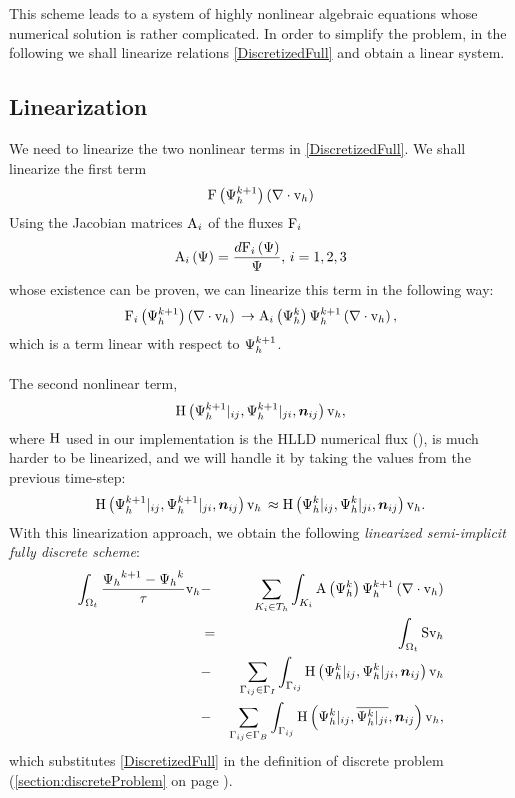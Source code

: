 This scheme leads to a system of highly nonlinear algebraic equations whose numerical solution is rather complicated. In order to simplify the problem, in the following we shall linearize relations \ref{DiscretizedFull} and obtain a linear system.
\subsection{Linearization}
We need to linearize the two nonlinear terms in \ref{DiscretizedFull}. We shall linearize the first term
$$
\mathrm{F}\left({\mathrm{\Psi}_h^{k+1}}\right) \left(\nabla \cdot \mathrm{v}_h\right)
$$
Using the Jacobian matrices $\mathrm{A}_i$ of the fluxes $\mathrm{F}_i$
$$
\mathrm{A}_i\left({\mathrm{\Psi}}\right) = \frac{d\mathrm{F}_i\left({\mathrm{\Psi}}\right)}{\mathrm{\Psi}},\,i = 1, 2, 3
$$
whose existence can be proven, we can linearize this term in the following way:
$$
\mathrm{F}_i\left({\mathrm{\Psi}_h^{k+1}}\right) \left(\nabla \cdot \mathrm{v}_h\right)\,\rightarrow \mathrm{A}_i\left({\mathrm{\Psi}_h^{k}}\right) \mathrm{\Psi}_h^{k+1} \left(\nabla \cdot \mathrm{v}_h\right),
$$
which is a term linear with respect to $\mathrm{\Psi}_h^{k+1}$.

\paragraph{}
The second nonlinear term,
$$
\mathrm{H}\left({\mathrm{\Psi}_h^{k+1}}|_{ij}, {\mathrm{\Psi}_h^{k+1}}|_{ji}, \mbox{\boldmath $n$}_{ij}\right) \mathrm{v}_h,
$$
where $\mathrm{H}$ used in our implementation is the HLLD numerical flux (\cite{hlld}), is much harder to be linearized, and we will handle it by taking the values from the previous time-step:
$$
\mathrm{H}\left({\mathrm{\Psi}_h^{k+1}}|_{ij}, {\mathrm{\Psi}_h^{k+1}}|_{ji}, \mbox{\boldmath $n$}_{ij}\right) \mathrm{v}_h\,\approx  \mathrm{H}\left({\mathrm{\Psi}_h^{k}}|_{ij}, {\mathrm{\Psi}_h^{k}}|_{ji}, \mbox{\boldmath $n$}_{ij}\right) \mathrm{v}_h.
$$
With this linearization approach, we obtain the following \textit{linearized semi-implicit fully discrete scheme}:
\begin{eqnarray}
\label{DiscretizedLinear} \int_{\Omega_{t}} \frac{{\mathrm{\Psi}_h}^{k+1} - {\mathrm{\Psi}_h}^{k}}{\tau} \mathrm{v}_h & - & \sum_{K_i \in T_h}\int_{K_i}\mathrm{A}\left({\mathrm{\Psi}_h^{k}}\right) \mathrm{\Psi}_h^{k+1} \left(\nabla \cdot \mathrm{v}_h\right)\\\nonumber & = & \int_{\Omega_{t}} \mathrm{S} \mathrm{v}_h\\\nonumber & - &\sum_{\Gamma_{ij}\in\Gamma_I} \int_{\Gamma_{ij}}\mathrm{H}\left({\mathrm{\Psi}_h^{k}}|_{ij}, {\mathrm{\Psi}_h^{k}}|_{ji}, \mbox{\boldmath $n$}_{ij}\right) \mathrm{v}_h
\\\nonumber & - &\sum_{\Gamma_{ij}\in\Gamma_B} \int_{\Gamma_{ij}} \mathrm{H}\left({\mathrm{\Psi}_h^{k}}|_{ij}, \overline{{\mathrm{\Psi}_h^{k}}|_{ji}}, \mbox{\boldmath $n$}_{ij}\right) \mathrm{v}_h,
\end{eqnarray}
which substitutes \ref{DiscretizedFull} in the definition of discrete problem (\ref{section:discreteProblem} on page \pageref{section:discreteProblem}).